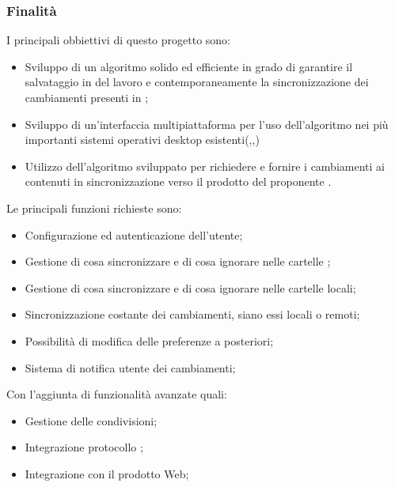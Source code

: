 \documentclass[]{article}
\begin{document}
            \subsubsection{Finalità}
            I principali obbiettivi di questo progetto sono:
            \begin{itemize}
                \item Sviluppo di un algoritmo solido ed efficiente in grado di garantire il salvataggio in  del lavoro e contemporaneamente la sincronizzazione dei cambiamenti presenti in   ;
                \item Sviluppo di un'interfaccia multipiattaforma per l'uso dell'algoritmo nei più importanti sistemi operativi desktop esistenti(,,)
                \item Utilizzo dell'algoritmo sviluppato per richiedere e fornire i cambiamenti ai contenuti in sincronizzazione verso il prodotto del proponente .
            \end{itemize}
            Le principali funzioni richieste sono:
            \begin{itemize}
                \item Configurazione ed autenticazione dell'utente;
                \item Gestione di cosa sincronizzare e di cosa ignorare nelle cartelle ;
                \item Gestione di cosa sincronizzare e di cosa ignorare nelle cartelle locali;
                \item Sincronizzazione costante dei cambiamenti, siano essi locali o remoti;
                \item Possibilità di modifica delle preferenze a posteriori;
                \item Sistema di notifica utente dei cambiamenti;
            \end{itemize}
            Con l'aggiunta di funzionalità avanzate quali:
            \begin{itemize}
                \item Gestione delle condivisioni;
                \item Integrazione protocollo ;
                \item Integrazione con il prodotto Web;
            \end{itemize}
\end{document}
